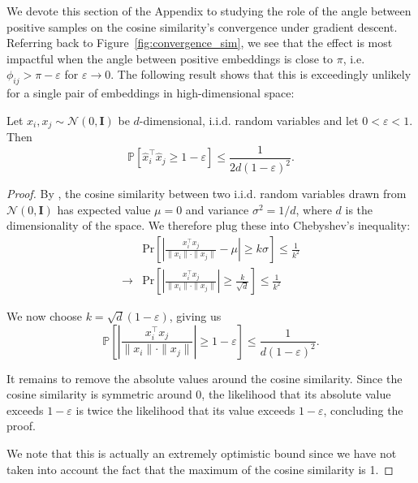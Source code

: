 We devote this section of the Appendix to studying the role of the angle between positive samples on the cosine similarity's convergence under gradient descent. Referring back to Figure~\ref{fig:convergence_sim}, we see that the effect is most impactful when the angle between positive embeddings is close to $\pi$, i.e. $\phi_{ij} > \pi - \varepsilon$ for $\varepsilon \rightarrow 0$. The following result shows that this is exceedingly unlikely for a single pair of embeddings in high-dimensional space:
\begin{proposition}
    \label{prop:unlikely_opp_halves}
    Let $x_i, x_j \sim \mathcal{N}(0, \mathbf{I})$ be $d$-dimensional, i.i.d. random variables and let $0 < \varepsilon < 1$. Then \vspace*{-0.1cm}
    \begin{equation}
    \label{eq:opp_halves_unlikely}
    \mathbb{P}\left[ \hat{x}_i^\top \hat{x}_j \geq 1 - \varepsilon \right] \leq \frac{1}{2d(1-\varepsilon)^2}.
    \end{equation}\vspace*{-0.3cm}
\end{proposition}
\begin{proof}
By \citet{distribution_of_cosine_sim}, the cosine similarity between two i.i.d. random variables drawn from $\mathcal{N}(0, \mathbf{I})$ has expected value $\mu = 0$ and variance $\sigma^2 = 1/d$, where $d$ is the dimensionality of the space. We therefore plug these into Chebyshev's inequality:
\begin{align*}
    &\text{Pr} \left[ \left|\frac{x_i^\top x_j}{\|x_i\|\cdot \|x_j\|} - \mu \right|\geq k \sigma \right] \leq \frac{1}{k^2} \\
    \rightarrow & \text{Pr} \left[ \left |\frac{x_i^\top x_j}{\|x_i\|\cdot \|x_j\|} \right |\geq \frac{k}{\sqrt{d}} \right] \leq \frac{1}{k^2}
\end{align*}

\noindent We now choose $k = \sqrt{d}(1 - \varepsilon)$, giving us
\[ \mathbb{P}\left[ \left |\frac{x_i^\top x_j}{\|x_i\| \cdot \|x_j\|}\right | \geq 1 - \varepsilon \right] \leq \frac{1}{d(1-\varepsilon)^2}.\]

It remains to remove the absolute values around the cosine similarity. Since the cosine similarity is symmetric around $0$, the likelihood that its absolute value exceeds $1 - \varepsilon$ is twice the likelihood that its value exceeds $1- \varepsilon$, concluding the proof.

We note that this is actually an extremely optimistic bound since we have not taken into account the fact that the maximum of the cosine similarity is 1.
\end{proof}

